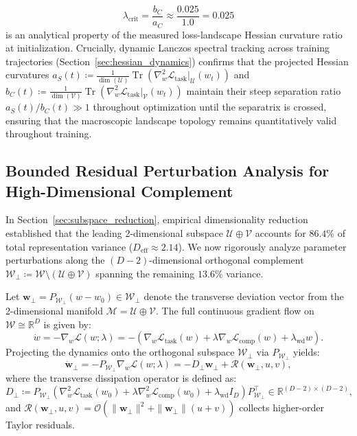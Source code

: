 \documentclass{article}
\theoremstyle{plain}
\theoremstyle{definition}
\DeclareMathOperator{\Tr}{Tr}
\begin{document}
\begin{equation}
    \lambda_{\text{crit}} = \frac{b_C}{a_C} \approx \frac{0.025}{1.0} = 0.025
\end{equation}
is an analytical property of the measured loss-landscape Hessian curvature ratio at initialization. Crucially, dynamic Lanczos spectral tracking across training trajectories (Section~\ref{sec:hessian_dynamics}) confirms that the projected Hessian curvatures $a_S(t) \coloneqq \frac{1}{\dim(\mathcal{U})}\Tr(\nabla_w^2 \mathcal{L}_{\text{task}}|_{\mathcal{U}}(w_t))$ and $b_C(t) \coloneqq \frac{1}{\dim(\mathcal{V})}\Tr(\nabla_w^2 \mathcal{L}_{\text{task}}|_{\mathcal{V}}(w_t))$ maintain their steep separation ratio $a_S(t) / b_C(t) \gg 1$ throughout optimization until the separatrix is crossed, ensuring that the macroscopic landscape topology remains quantitatively valid throughout training.

\subsection{Bounded Residual Perturbation Analysis for High-Dimensional Complement}
\label{sec:app_residual_perturbation}
In Section~\ref{sec:subspace_reduction}, empirical dimensionality reduction established that the leading 2-dimensional subspace $\mathcal{U} \oplus \mathcal{V}$ accounts for $86.4\%$ of total representation variance ($D_{\text{eff}} \approx 2.14$). We now rigorously analyze parameter perturbations along the $(D-2)$-dimensional orthogonal complement $\mathcal{W}_\perp \coloneqq \mathcal{W} \setminus (\mathcal{U} \oplus \mathcal{V})$ spanning the remaining $13.6\%$ variance.

Let $\mathbf{w}_\perp = P_{\mathcal{W}_\perp} (w - w_0) \in \mathcal{W}_\perp$ denote the transverse deviation vector from the 2-dimensional manifold $\mathcal{M} = \mathcal{U} \oplus \mathcal{V}$. The full continuous gradient flow on $\mathcal{W} \cong \mathbb{R}^D$ is given by:
\begin{equation}
    \dot{w} = -\nabla_w \mathcal{L}(w; \lambda) = -\left( \nabla_w \mathcal{L}_{\text{task}}(w) + \lambda \nabla_w \mathcal{L}_{\text{comp}}(w) + \lambda_{\text{wd}} w \right).
\end{equation}
Projecting the dynamics onto the orthogonal subspace $\mathcal{W}_\perp$ via $P_{\mathcal{W}_\perp}$ yields:
\begin{equation}
    \dot{\mathbf{w}}_\perp = -P_{\mathcal{W}_\perp} \nabla_w \mathcal{L}(w; \lambda) = -D_\perp \mathbf{w}_\perp + \mathcal{R}(\mathbf{w}_\perp, u, v),
    \label{eq:w_perp_dynamics}
\end{equation}
where the transverse dissipation operator is defined as:
\begin{equation}
    D_\perp \coloneqq P_{\mathcal{W}_\perp} \left( \nabla_w^2 \mathcal{L}_{\text{task}}(w_0) + \lambda \nabla_w^2 \mathcal{L}_{\text{comp}}(w_0) + \lambda_{\text{wd}} I_D \right) P_{\mathcal{W}_\perp}^\top \in \mathbb{R}^{(D-2) \times (D-2)},
\end{equation}
and $\mathcal{R}(\mathbf{w}_\perp, u, v) = \mathcal{O}(\|\mathbf{w}_\perp\|^2 + \|\mathbf{w}_\perp\| (u + v))$ collects higher-order Taylor residuals.
\end{document}
